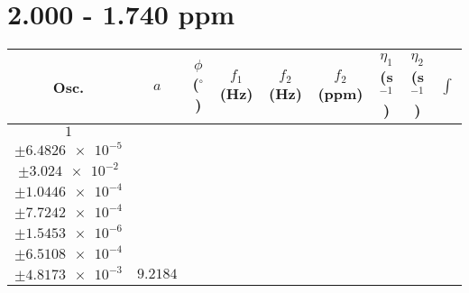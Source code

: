 \documentclass[8pt]{article}
\begin{document}
\section*{2.000 - 1.740 ppm}
\begin{longtable}[l]{c c c c c c c c c}
\toprule
Osc. & $a$ & $\phi$ ($^{\circ}$) & $f_1$ (Hz) & $f_2$ (Hz) & $f_2$ (ppm) & $\eta_1$ (s$^{-1}$) & $\eta_2$ (s$^{-1}$) & $\int$\\
\midrule
$\num{1}$ & \begin{tabular}[c]{@{}c@{}}$\num{0.12441}$ \\ $\pm\num{6.4826e-5}$\end{tabular} & \begin{tabular}[c]{@{}c@{}}$\num{-0.18344}$ \\ $\pm\num{3.024e-2}$\end{tabular} & \begin{tabular}[c]{@{}c@{}}$\num{-6.6488}$ \\ $\pm\num{1.0446e-4}$\end{tabular} & \begin{tabular}[c]{@{}c@{}}$\num{938.04}$ \\ $\pm\num{7.7242e-4}$\end{tabular} & \begin{tabular}[c]{@{}c@{}}$\num{1.8766}$ \\ $\pm\num{1.5453e-6}$\end{tabular} & \begin{tabular}[c]{@{}c@{}}$\num{1.1782}$ \\ $\pm\num{6.5108e-4}$\end{tabular} & \begin{tabular}[c]{@{}c@{}}$\num{4.2677}$ \\ $\pm\num{4.8173e-3}$\end{tabular} & $\num{9.2184}$\\

\end{longtable}
\end{document}
